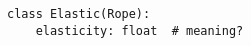 \par\begin{minipage}{60ex}
\begin{verbatim}
class Elastic(Rope):
    elasticity: float  # meaning?
\end{verbatim}
\end{minipage}\par